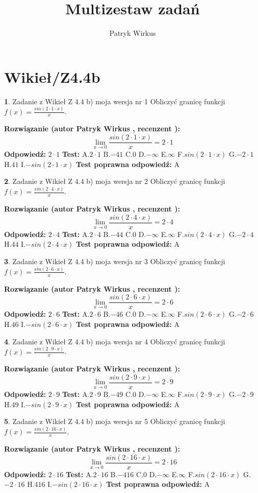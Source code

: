 \documentclass[12pt, a4paper]{article}
\title{Multizestaw zadań}
\author{Patryk Wirkus}
\date{}
\theoremstyle{definition} %
\newtheorem{zad}{}
\newcommand{\kategoria}[1]{\section{#1}}
\newcommand{\zadStart}[1]{\begin{zad}#1\newline}
\newcommand{\zadStop}{\end{zad}}
\newcommand{\rozwStart}[2]{\noindent \textbf{Rozwiązanie (autor #1 , recenzent #2): }\newline}
\newcommand{\rozwStop}{\newline}
\newcommand{\odpStart}{\noindent \textbf{Odpowiedź:}\newline}
\newcommand{\odpStop}{\newline}
\newcommand{\testStart}{\noindent \textbf{Test:}\newline}
\newcommand{\testStop}{\newline}
\newcommand{\kluczStart}{\noindent \textbf{Test poprawna odpowiedź:}\newline}
\newcommand{\kluczStop}{\newline}
\begin{document}
\maketitle

\kategoria{Wikieł/Z4.4b}


\zadStart{Zadanie z Wikieł Z 4.4 b) moja wersja nr 1}
Obliczyć granicę funkcji $f(x)=\frac{sin(2 \cdot1\cdot x)}{x}$.
\zadStop
\rozwStart{Patryk Wirkus}{}
$$\lim\limits_{x\to 0}\frac{sin(2 \cdot 1\cdot x)}{x}=
2 \cdot 1$$
\rozwStop
\odpStart
$2 \cdot 1$
\odpStop
\testStart
A.$2 \cdot 1$
B.$-41$
C.$0$
D.$-\infty$
E.$\infty$
F.$sin(2 \cdot 1\cdot x)$
G.$-2 \cdot 1$
H.$41$
I.$-sin(2 \cdot 1\cdot x)$
\testStop
\kluczStart
A
\kluczStop



\zadStart{Zadanie z Wikieł Z 4.4 b) moja wersja nr 2}
Obliczyć granicę funkcji $f(x)=\frac{sin(2 \cdot4\cdot x)}{x}$.
\zadStop
\rozwStart{Patryk Wirkus}{}
$$\lim\limits_{x\to 0}\frac{sin(2 \cdot 4\cdot x)}{x}=
2 \cdot 4$$
\rozwStop
\odpStart
$2 \cdot 4$
\odpStop
\testStart
A.$2 \cdot 4$
B.$-44$
C.$0$
D.$-\infty$
E.$\infty$
F.$sin(2 \cdot 4\cdot x)$
G.$-2 \cdot 4$
H.$44$
I.$-sin(2 \cdot 4\cdot x)$
\testStop
\kluczStart
A
\kluczStop



\zadStart{Zadanie z Wikieł Z 4.4 b) moja wersja nr 3}
Obliczyć granicę funkcji $f(x)=\frac{sin(2 \cdot6\cdot x)}{x}$.
\zadStop
\rozwStart{Patryk Wirkus}{}
$$\lim\limits_{x\to 0}\frac{sin(2 \cdot 6\cdot x)}{x}=
2 \cdot 6$$
\rozwStop
\odpStart
$2 \cdot 6$
\odpStop
\testStart
A.$2 \cdot 6$
B.$-46$
C.$0$
D.$-\infty$
E.$\infty$
F.$sin(2 \cdot 6\cdot x)$
G.$-2 \cdot 6$
H.$46$
I.$-sin(2 \cdot 6\cdot x)$
\testStop
\kluczStart
A
\kluczStop



\zadStart{Zadanie z Wikieł Z 4.4 b) moja wersja nr 4}
Obliczyć granicę funkcji $f(x)=\frac{sin(2 \cdot9\cdot x)}{x}$.
\zadStop
\rozwStart{Patryk Wirkus}{}
$$\lim\limits_{x\to 0}\frac{sin(2 \cdot 9\cdot x)}{x}=
2 \cdot 9$$
\rozwStop
\odpStart
$2 \cdot 9$
\odpStop
\testStart
A.$2 \cdot 9$
B.$-49$
C.$0$
D.$-\infty$
E.$\infty$
F.$sin(2 \cdot 9\cdot x)$
G.$-2 \cdot 9$
H.$49$
I.$-sin(2 \cdot 9\cdot x)$
\testStop
\kluczStart
A
\kluczStop



\zadStart{Zadanie z Wikieł Z 4.4 b) moja wersja nr 5}
Obliczyć granicę funkcji $f(x)=\frac{sin(2 \cdot16\cdot x)}{x}$.
\zadStop
\rozwStart{Patryk Wirkus}{}
$$\lim\limits_{x\to 0}\frac{sin(2 \cdot 16\cdot x)}{x}=
2 \cdot 16$$
\rozwStop
\odpStart
$2 \cdot 16$
\odpStop
\testStart
A.$2 \cdot 16$
B.$-416$
C.$0$
D.$-\infty$
E.$\infty$
F.$sin(2 \cdot 16\cdot x)$
G.$-2 \cdot 16$
H.$416$
I.$-sin(2 \cdot 16\cdot x)$
\testStop
\kluczStart
A
\kluczStop
\end{document}
